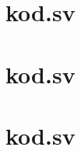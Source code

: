 \documentclass[a4paper]{article}
\begin{document}
\begin{appendices}
\section{kod.sv}
\section{kod.sv}
\section{kod.sv}
\end{appendices}
\end{document}
